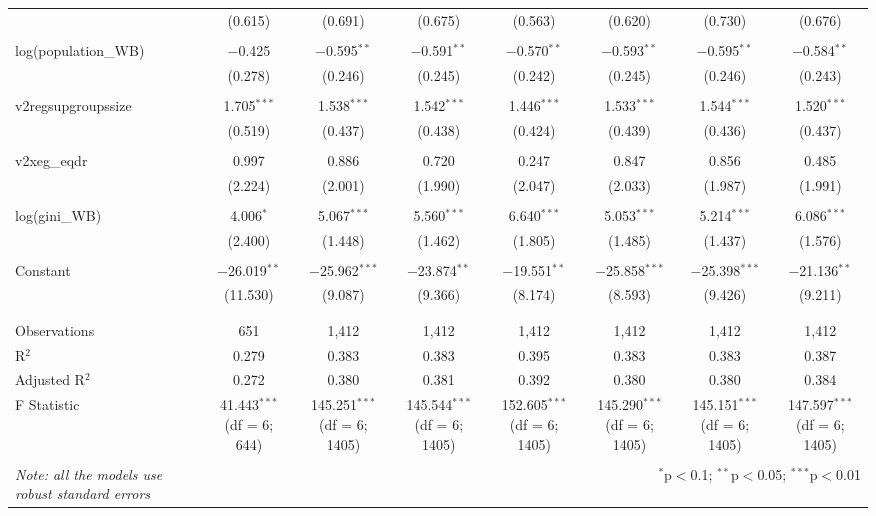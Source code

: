 \documentclass[a4paper, 12pt]{article}
\begin{document}
\begin{landscape}
\begin{table}[!htbp]
{\begin{tabular}{@{\extracolsep{5pt}}lccccccc}
  & (0.615) & (0.691) & (0.675) & (0.563) & (0.620) & (0.730) & (0.676) \\ 
  & & & & & & & \\ 
 log(population\_WB) & $-$0.425 & $-$0.595$^{**}$ & $-$0.591$^{**}$ & $-$0.570$^{**}$ & $-$0.593$^{**}$ & $-$0.595$^{**}$ & $-$0.584$^{**}$ \\ 
  & (0.278) & (0.246) & (0.245) & (0.242) & (0.245) & (0.246) & (0.243) \\ 
  & & & & & & & \\ 
 v2regsupgroupssize & 1.705$^{***}$ & 1.538$^{***}$ & 1.542$^{***}$ & 1.446$^{***}$ & 1.533$^{***}$ & 1.544$^{***}$ & 1.520$^{***}$ \\ 
  & (0.519) & (0.437) & (0.438) & (0.424) & (0.439) & (0.436) & (0.437) \\ 
  & & & & & & & \\ 
 v2xeg\_eqdr & 0.997 & 0.886 & 0.720 & 0.247 & 0.847 & 0.856 & 0.485 \\ 
  & (2.224) & (2.001) & (1.990) & (2.047) & (2.033) & (1.987) & (1.991) \\ 
  & & & & & & & \\ 
 log(gini\_WB) & 4.006$^{*}$ & 5.067$^{***}$ & 5.560$^{***}$ & 6.640$^{***}$ & 5.053$^{***}$ & 5.214$^{***}$ & 6.086$^{***}$ \\ 
  & (2.400) & (1.448) & (1.462) & (1.805) & (1.485) & (1.437) & (1.576) \\ 
  & & & & & & & \\ 
 Constant & $-$26.019$^{**}$ & $-$25.962$^{***}$ & $-$23.874$^{**}$ & $-$19.551$^{**}$ & $-$25.858$^{***}$ & $-$25.398$^{***}$ & $-$21.136$^{**}$ \\ 
  & (11.530) & (9.087) & (9.366) & (8.174) & (8.593) & (9.426) & (9.211) \\ 
  & & & & & & & \\ 
\hline \\[-1.8ex] 
Observations & 651 & 1,412 & 1,412 & 1,412 & 1,412 & 1,412 & 1,412 \\ 
R$^{2}$ & 0.279 & 0.383 & 0.383 & 0.395 & 0.383 & 0.383 & 0.387 \\ 
Adjusted R$^{2}$ & 0.272 & 0.380 & 0.381 & 0.392 & 0.380 & 0.380 & 0.384 \\ 
F Statistic & 41.443$^{***}$ (df = 6; 644) & 145.251$^{***}$ (df = 6; 1405) & 145.544$^{***}$ (df = 6; 1405) & 152.605$^{***}$ (df = 6; 1405) & 145.290$^{***}$ (df = 6; 1405) & 145.151$^{***}$ (df = 6; 1405) & 147.597$^{***}$ (df = 6; 1405) \\ 
\hline 
\hline \\[-1.8ex] 
\textit{Note: all the models use robust standard errors}  & \multicolumn{7}{r}{$^{*}$p$<$0.1; $^{**}$p$<$0.05; $^{***}$p$<$0.01} \\
\end{tabular} 
}
\end{table}


\end{landscape}
\end{document}
